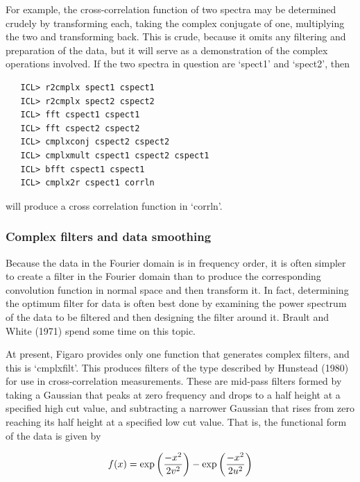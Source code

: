    For example, the cross-correlation function of two spectra may be
   determined crudely by transforming each, taking the complex conjugate
   of one, multiplying the two and transforming back.  This is crude,
   because it omits any filtering and preparation of the data, but it
   will serve as a demonstration of the complex operations involved.  If
   the two spectra in question are `spect1' and `spect2', then

\begin{verbatim}
   ICL> r2cmplx spect1 cspect1
   ICL> r2cmplx spect2 cspect2
   ICL> fft cspect1 cspect1
   ICL> fft cspect2 cspect2
   ICL> cmplxconj cspect2 cspect2
   ICL> cmplxmult cspect1 cspect2 cspect1
   ICL> bfft cspect1 cspect1
   ICL> cmplx2r cspect1 corrln
\end{verbatim}

   will produce a cross correlation function in `corrln'.


\subsubsection{\label{techno6filters}Complex filters and data smoothing}

   Because the data in the Fourier domain is in frequency order, it is
   often simpler to create a filter in the Fourier domain than to
   produce the corresponding convolution function in normal space and
   then transform it.  In fact, determining the optimum filter for data
   is often best done by examining the power spectrum of the data to be
   filtered and then designing the filter around it.  Brault and White
   (1971) spend some time on this topic.

   At present, Figaro provides only one function that generates complex
   filters, and this is `cmplxfilt'.  This produces filters of the type
   described by Hunstead (1980) for use in cross-correlation
   measurements.  These are mid-pass filters formed by taking a Gaussian
   that peaks at zero frequency and drops to a half height at a
   specified high cut value, and subtracting a narrower Gaussian that
   rises from zero reaching its half height at a specified low cut
   value.  That is, the functional form of the data is given by

\begin{displaymath}
   f(x) = \exp{\left({{-x^2}\over{2 v^2}}\right)}
        - \exp{\left({{-x^2}\over{2 u^2}}\right)}
\end{displaymath}

